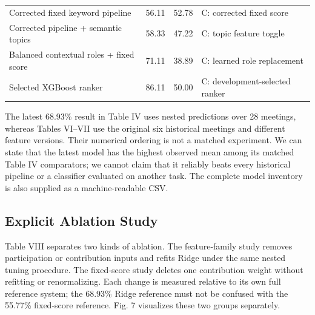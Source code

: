 \documentclass[journal]{IEEEtran}
\begin{document}
\begin{table}[t]
\begin{tabular}{p{}p{}p{}p{}}
{\raggedright Corrected fixed keyword pipeline\par} & {\raggedright 56.11\par} & {\raggedright 52.78\par} & {\raggedright C: corrected fixed score\par} \\
{\raggedright Corrected pipeline + semantic topics\par} & {\raggedright 58.33\par} & {\raggedright 47.22\par} & {\raggedright C: topic feature toggle\par} \\
{\raggedright Balanced contextual roles + fixed score\par} & {\raggedright 71.11\par} & {\raggedright 38.89\par} & {\raggedright C: learned role replacement\par} \\
{\raggedright Selected XGBoost ranker\par} & {\raggedright 86.11\par} & {\raggedright 50.00\par} & {\raggedright C: development-selected ranker\par} \\
\bottomrule
\end{tabular}
\end{table}
The latest 68.93\% result in Table IV uses nested predictions over 28 meetings, whereas Tables VI--VII use the original six historical meetings and different feature versions. Their numerical ordering is not a matched experiment. We can state that the latest model has the highest observed mean among its matched Table IV comparators; we cannot claim that it reliably beats every historical pipeline or a classifier evaluated on another task. The complete model inventory is also supplied as a machine-readable CSV.

\subsection{Explicit Ablation Study}
Table VIII separates two kinds of ablation. The feature-family study removes participation or contribution inputs and refits Ridge under the same nested tuning procedure. The fixed-score study deletes one contribution weight without refitting or renormalizing. Each change is measured relative to its own full reference system; the 68.93\% Ridge reference must not be confused with the 55.77\% fixed-score reference. Fig. 7 visualizes these two groups separately.
\end{document}
